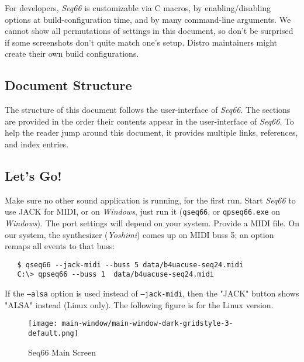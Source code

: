\documentclass[
 11pt,
 twoside,
 a4paper,
 headinclude,
 footinclude,
 final                                 %
]{article}
\begin{document}
   For developers, \textsl{Seq66} is customizable via C macros,
   by enabling/disabling options at build-configuration time, and by many
   command-line arguments.  We cannot show all permutations of settings in this
   document, so don't be surprised if some screenshots don't quite match
   one's setup.  Distro maintainers might create their own build
   configurations.

\subsection{Document Structure}
\label{subsec:introduction_document_structure}

   The structure of this document follows the user-interface of
   \textsl{Seq66}.  The sections are provided in the order
   their contents appear in the user-interface of \textsl{Seq66}.  To
   help the reader jump around this document, it provides
   multiple links, references, and index entries.

\subsection{Let's Go!}
\label{subsec:introduction_lets_get_started}

   Make sure no other sound application is running, for the first run.
   Start \textsl{Seq66} to use JACK for MIDI, or
   on \textsl{Windows}, just run it (\texttt{qseq66}, or \texttt{qpseq66.exe}
   on \textsl{Windows}).
   The port settings will depend on your system.  Provide a MIDI file.
   On our system, the synthesizer
   (\textsl{Yoshimi}) comes up on MIDI buss 5; an option remaps
   all events to that buss:

\begin{verbatim}
   $ qseq66 --jack-midi --buss 5 data/b4uacuse-seq24.midi
   C:\> qpseq66 --buss 1  data/b4uacuse-seq24.midi
\end{verbatim}

   If the \texttt{--alsa} option is used instead of
   \texttt{--jack-midi}, then the "JACK" button shows "ALSA" instead
   (Linux only).  The following figure is for the Linux
   version.

\begin{figure}[H]
   \centering 
   \texttt{[image: main-window/main-window-dark-gridstyle-3-default.png]}
   \caption{Seq66 Main Screen}
   \label{fig:seq66_main_screen}
\end{figure}
\end{document}
